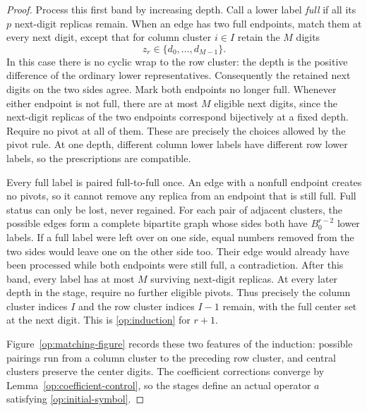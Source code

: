 \begin{proof}
Process this first band by increasing depth. Call a lower label
\emph{full} if all its $p$ next-digit replicas remain. When an edge has
two full endpoints, match them at every next digit, except that for
column cluster $i\in I$ retain the $M$ digits
\begin{equation}
 z_r\in\{d_0,\ldots,d_{M-1}\}.
 \label{op:retained-digits}
\end{equation}
In this case there is no cyclic wrap to the row cluster: the depth is
the positive difference of the ordinary lower representatives.
Consequently the retained next digits on the two sides agree. Mark
both endpoints no longer full. Whenever either endpoint is not full,
there are at most $M$ eligible next digits, since the next-digit
replicas of the two endpoints correspond bijectively at a fixed
depth. Require no pivot at all of them. These are precisely the
choices allowed by the pivot rule. At one depth, different column
lower labels have different row lower labels, so the prescriptions
are compatible.

Every full label is paired full-to-full once. An edge with a nonfull
endpoint creates no pivots, so it cannot remove any replica from an
endpoint that is still full. Full status can only be lost, never regained.
For each pair
of adjacent clusters, the possible edges form a complete bipartite
graph whose sides both have $B_0^{r-2}$ lower labels. If a full label
were left over on one side, equal numbers removed from the two sides
would leave one on the other side too. Their edge would already have
been processed while both endpoints were still full, a contradiction. After this
band, every label has at most $M$ surviving next-digit replicas.
At every later depth in the stage, require no further eligible pivots.
Thus precisely the column cluster indices $I$ and the row cluster
indices $I-1$ remain, with the full center set at the next digit.
This is \eqref{op:induction} for $r+1$.

Figure~\ref{op:matching-figure} records these two features of the
induction: possible pairings run from a column cluster to the preceding
row cluster, and central clusters preserve the center digits. The
coefficient corrections converge by
Lemma~\ref{op:coefficient-control}, so the stages define an actual
operator $a$ satisfying \eqref{op:initial-symbol}.


\end{proof}
